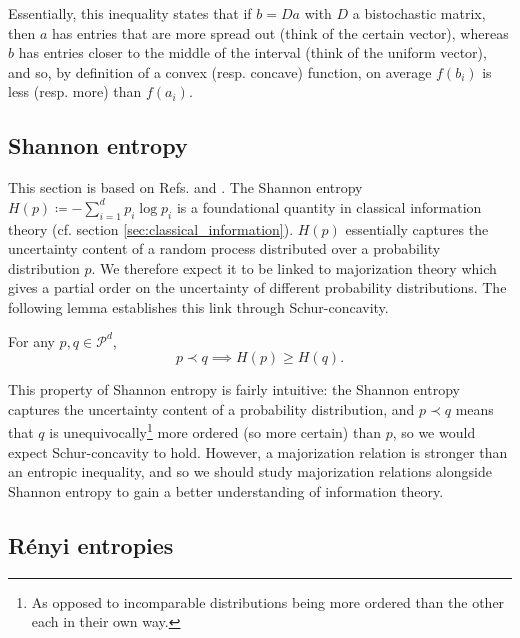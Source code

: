 Essentially, this inequality states that if $b = Da$ with $D$ a bistochastic matrix, then $a$ has entries that are more spread out (think of the certain vector), whereas $b$ has entries closer to the middle of the interval (think of the uniform vector), and so, by definition of a convex (resp. concave) function, on average $f(b_i)$ is less (resp. more) than $f(a_i)$.



\subsection{Shannon entropy} \label{sec:schur_shannon}

This section is based on Refs. \cite[p. 101]{marshall_inequalities_2011} and \cite[p. 88]{cover_elements_2006}. %
The Shannon entropy $H(p) \coloneqq - \sum_{i = 1}^{d} p_i \log p_i$ is a foundational quantity in classical information theory (cf. section \ref{sec:classical_information}). $H(p)$ essentially captures the uncertainty content of a random process distributed over a probability distribution $p$. We therefore expect it to be linked to majorization theory which gives a partial order on the uncertainty of different probability distributions. The following lemma establishes this link through Schur-concavity.

\begin{lemma}
    For any $p, q \in \mathcal{P}^d$,
    \begin{equation}
        p \prec q \implies  H(p) \geq H(q).
    \end{equation}
\end{lemma}

This property of Shannon entropy is fairly intuitive: the Shannon entropy captures the uncertainty content of a probability distribution, and $p \prec q$ means that $q$ is unequivocally\footnote{As opposed to incomparable distributions being more ordered than the other each in their own way.} more ordered (so more certain) than $p$, so we would expect Schur-concavity to hold. However, a majorization relation is stronger than an entropic inequality, and so we should study majorization relations alongside Shannon entropy to gain a better understanding of information theory.

\subsection{Rényi entropies}

